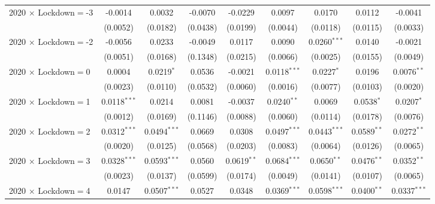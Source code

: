 \begin{tabular}{lcccccccc}
   2020 $\times$ Lockdown$=$-3 & -0.0014        & 0.0032         & -0.0070       & -0.0229        & 0.0097         & 0.0170         & 0.0112         & -0.0041\\
                                & (0.0052)       & (0.0182)       & (0.0438)      & (0.0199)       & (0.0044)       & (0.0118)       & (0.0115)       & (0.0033)\\
   2020 $\times$ Lockdown$=$-2 & -0.0056        & 0.0233         & -0.0049       & 0.0117         & 0.0090         & 0.0260$^{***}$ & 0.0140         & -0.0021\\
                                & (0.0051)       & (0.0168)       & (0.1348)      & (0.0215)       & (0.0066)       & (0.0025)       & (0.0155)       & (0.0049)\\
   2020 $\times$ Lockdown$=$0  & 0.0004         & 0.0219$^{*}$   & 0.0536        & -0.0021        & 0.0118$^{***}$ & 0.0227$^{*}$   & 0.0196         & 0.0076$^{**}$\\
                                & (0.0023)       & (0.0110)       & (0.0532)      & (0.0060)       & (0.0016)       & (0.0077)       & (0.0103)       & (0.0020)\\
   2020 $\times$ Lockdown$=$1  & 0.0118$^{***}$ & 0.0214         & 0.0081        & -0.0037        & 0.0240$^{**}$  & 0.0069         & 0.0538$^{*}$   & 0.0207$^{*}$\\
                                & (0.0012)       & (0.0169)       & (0.1146)      & (0.0088)       & (0.0060)       & (0.0114)       & (0.0178)       & (0.0076)\\
   2020 $\times$ Lockdown$=$2  & 0.0312$^{***}$ & 0.0494$^{***}$ & 0.0669        & 0.0308         & 0.0497$^{***}$ & 0.0443$^{***}$ & 0.0589$^{**}$  & 0.0272$^{**}$\\
                                & (0.0020)       & (0.0125)       & (0.0568)      & (0.0203)       & (0.0083)       & (0.0064)       & (0.0126)       & (0.0065)\\
   2020 $\times$ Lockdown$=$3  & 0.0328$^{***}$ & 0.0593$^{***}$ & 0.0560        & 0.0619$^{**}$  & 0.0684$^{***}$ & 0.0650$^{**}$  & 0.0476$^{**}$  & 0.0352$^{**}$\\
                                & (0.0023)       & (0.0137)       & (0.0599)      & (0.0174)       & (0.0049)       & (0.0141)       & (0.0107)       & (0.0065)\\
   2020 $\times$ Lockdown$=$4  & 0.0147         & 0.0507$^{***}$ & 0.0527        & 0.0348         & 0.0369$^{***}$ & 0.0598$^{***}$ & 0.0400$^{**}$  & 0.0337$^{***}$\\

\end{tabular}
